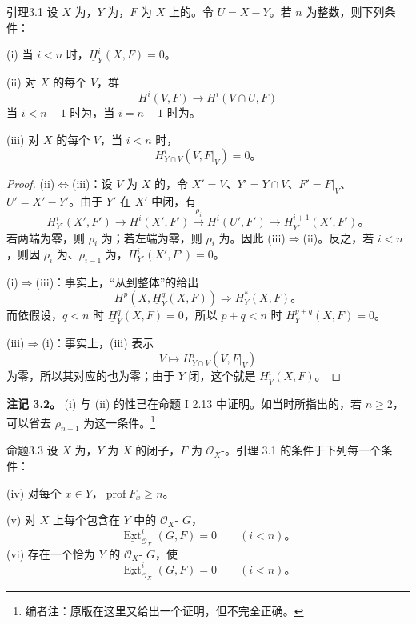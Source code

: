 \begin{SGAresult}{引理}{3.1}
设 $X$ 为，$Y$ 为，$F$ 为 $X$ 上的。令 $U=X-Y$。若 $n$ 为整数，则下列条件：

\textnormal{(i)} 当 $i<n$ 时，$\underline H_Y^i(X,F)=0$。

\textnormal{(ii)} 对 $X$ 的每个 $V$，群
\[
H^i(V,F)\longrightarrow H^i(V\cap U,F)
\]
当 $i<n-1$ 时为，当 $i=n-1$ 时为。

\textnormal{(iii)} 对 $X$ 的每个 $V$，当 $i<n$ 时，
\[
H_{Y\cap V}^i(V,F|_V)=0。
\]
\end{SGAresult}
\begin{proof}
(ii)$\Leftrightarrow$(iii)：设 $V$ 为 $X$ 的，令 $X'=V$、$Y'=Y\cap V$、$F'=F|_V$、$U'=X'-Y'$。由于 $Y'$ 在 $X'$ 中闭，有
\[
H_{Y'}^i(X',F')\longrightarrow H^i(X',F')
\xrightarrow{\rho_i}H^i(U',F')\longrightarrow H_{Y'}^{i+1}(X',F')。
\]
若两端为零，则 $\rho_i$ 为；若左端为零，则 $\rho_i$ 为。因此 (iii)$\Rightarrow$(ii)。反之，若 $i<n$，则因 $\rho_i$ 为、$\rho_{i-1}$ 为，$H_{Y'}^i(X',F')=0$。

(i)$\Rightarrow$(iii)：事实上，“从到整体”的给出
\[
H^p(X,\underline H_Y^q(X,F))\Longrightarrow H_Y^*(X,F)。
\]
而依假设，$q<n$ 时 $\underline H_Y^q(X,F)=0$，所以 $p+q<n$ 时 $H_Y^{p+q}(X,F)=0$。

(iii)$\Rightarrow$(i)：事实上，(iii) 表示
\[
V\longmapsto H_{Y\cap V}^i(V,F|_V)
\]
为零，所以其对应的也为零；由于 $Y$ 闭，这个就是 $\underline H_Y^i(X,F)$。
\end{proof}
\textbf{注记 3.2。}
(i) 与 (ii) 的性已在命题 I 2.13 中证明。如当时所指出的，若 $n\ge2$，可以省去 $\rho_{n-1}$ 为这一条件。\footnote{编者注：原版在这里又给出一个证明，但不完全正确。}
\begin{SGAresult}{命题}{3.3}
设 $X$ 为，$Y$ 为 $X$ 的闭子，$F$ 为 $\mathcal O_X$-。引理 3.1 的条件于下列每一个条件：

\textnormal{(iv)} 对每个 $x\in Y$，$\operatorname{prof}F_x\ge n$。

\textnormal{(v)} 对 $X$ 上每个包含在 $Y$ 中的 $\mathcal O_X$- $G$，
\[
\underline{\operatorname{Ext}}_{\mathcal O_X}^i(G,F)=0\qquad(i<n)。
\]
\textnormal{(vi)} 存在一个恰为 $Y$ 的 $\mathcal O_X$- $G$，使
\[
\underline{\operatorname{Ext}}_{\mathcal O_X}^i(G,F)=0\qquad(i<n)。
\]
\end{SGAresult}
